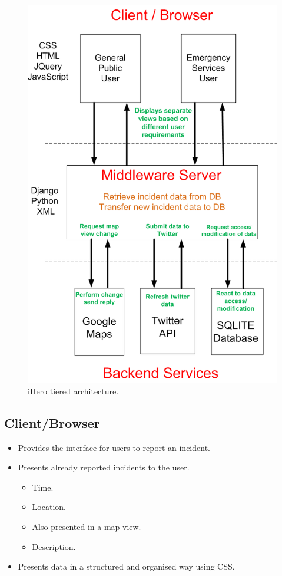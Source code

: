 \documentclass{sig-alt-release2}
\begin{document}
\begin{figure}[!ht]
  \caption{iHero tiered architecture.}
  \begin{center}
    \includegraphics[scale=0.3]{img/2.png}
  \end{center}
\end{figure}

\subsection{Client/Browser}

\begin{itemize}
\item    Provides the interface for users to report an incident.
\item    Presents already reported incidents to the user.
  \begin{itemize}
  \item        Time.
  \item        Location.
  \item            Also presented in a map view.
  \item        Description.
  \end{itemize}
\item    Presents data in a structured and organised way using CSS.
\end{itemize}
\end{document}
